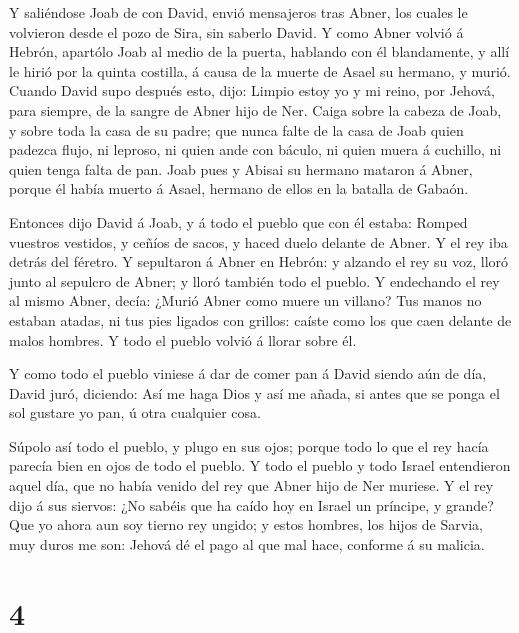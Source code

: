  Y saliéndose Joab de con David, envió mensajeros tras
Abner, los cuales le volvieron desde el pozo de Sira, sin saberlo David.
 Y como Abner volvió á Hebrón, apartólo Joab al medio de la
puerta, hablando con él blandamente, y allí le hirió por la quinta
costilla, á causa de la muerte de Asael su hermano, y murió.
 Cuando David supo después esto, dijo: Limpio estoy yo y mi
reino, por Jehová, para siempre, de la sangre de Abner hijo de Ner.
 Caiga sobre la cabeza de Joab, y sobre toda la casa de su
padre; que nunca falte de la casa de Joab quien padezca flujo, ni
leproso, ni quien ande con báculo, ni quien muera á cuchillo, ni quien
tenga falta de pan.  Joab pues y Abisai su hermano mataron
á Abner, porque él había muerto á Asael, hermano de ellos en la batalla
de Gabaón.

 Entonces dijo David á Joab, y á todo el pueblo que con él
estaba: Romped vuestros vestidos, y ceñíos de sacos, y haced duelo
delante de Abner. Y el rey iba detrás del féretro.  Y
sepultaron á Abner en Hebrón: y alzando el rey su voz, lloró junto al
sepulcro de Abner; y lloró también todo el pueblo.  Y
endechando el rey al mismo Abner, decía: ¿Murió Abner como muere un
villano?  Tus manos no estaban atadas, ni tus pies ligados
con grillos: caíste como los que caen delante de malos hombres. Y todo
el pueblo volvió á llorar sobre él.

 Y como todo el pueblo viniese á dar de comer pan á David
siendo aún de día, David juró, diciendo: Así me haga Dios y así me
añada, si antes que se ponga el sol gustare yo pan, ú otra cualquier
cosa.

 Súpolo así todo el pueblo, y plugo en sus ojos; porque
todo lo que el rey hacía parecía bien en ojos de todo el pueblo.
 Y todo el pueblo y todo Israel entendieron aquel día, que
no había venido del rey que Abner hijo de Ner muriese.  Y
el rey dijo á sus siervos: ¿No sabéis que ha caído hoy en Israel un
príncipe, y grande?  Que yo ahora aun soy tierno rey
ungido; y estos hombres, los hijos de Sarvia, muy duros me son: Jehová
dé el pago al que mal hace, conforme á su malicia.

\hypertarget{section-3}{%
\section{4}\label{section-3}}

